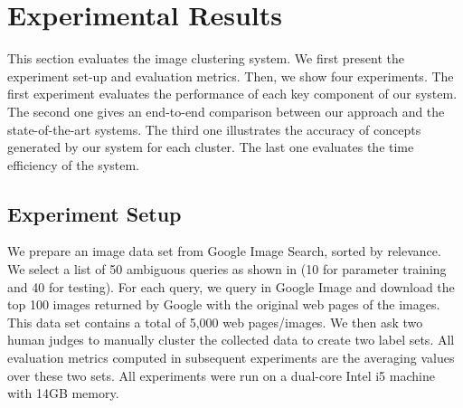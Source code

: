 \section{Experimental Results}
\label{sec:eval}
This section evaluates the image clustering system.
We first present the experiment set-up and evaluation metrics.
Then, we show four experiments.
The first experiment evaluates the performance of each key component
of our system. %
The second one gives an end-to-end comparison between our
 approach and the state-of-the-art systems.
The third one illustrates the accuracy of concepts generated
by our system for each cluster.
The last one evaluates the time efficiency of the system.


\subsection{Experiment Setup}

We prepare an image data set from Google Image Search,
sorted by relevance.
We select a list of 50 ambiguous queries as shown in 
(10 for parameter training and 40 for testing).
For each query, we query in Google Image and
download the top 100 images returned by Google with the original web pages of the images.
This data set contains a total of 5,000 web pages/images.
We then ask two human judges to manually cluster the collected data to
create two label sets. All evaluation metrics computed in subsequent
experiments are the averaging values over these two sets.
All experiments were run on a dual-core Intel i5
machine with 14GB memory.

